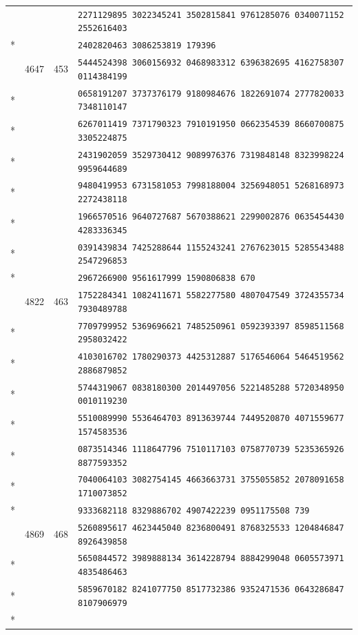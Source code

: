 \documentclass[10pt]{article}
\begin{document}
\begin{longtable}{@{}r@{\quad}r@{\quad}r@{\quad}l@{}}
 & &  & \texttt{2271129895 3022345241 3502815841 9761285076 0340071152 2552616403}\\*
 & &  & \texttt{2402820463 3086253819 179396}\\
\addlinespace[2pt]
88 & 4647 & 453 & \texttt{5444524398 3060156932 0468983312 6396382695 4162758307 0114384199}\\*
 & &  & \texttt{0658191207 3737376179 9180984676 1822691074 2777820033 7348110147}\\*
 & &  & \texttt{6267011419 7371790323 7910191950 0662354539 8660700875 3305224875}\\*
 & &  & \texttt{2431902059 3529730412 9089976376 7319848148 8323998224 9959644689}\\*
 & &  & \texttt{9480419953 6731581053 7998188004 3256948051 5268168973 2272438118}\\*
 & &  & \texttt{1966570516 9640727687 5670388621 2299002876 0635454430 4283336345}\\*
 & &  & \texttt{0391439834 7425288644 1155243241 2767623015 5285543488 2547296853}\\*
 & &  & \texttt{2967266900 9561617999 1590806838 670}\\
\addlinespace[2pt]
89 & 4822 & 463 & \texttt{1752284341 1082411671 5582277580 4807047549 3724355734 7930489788}\\*
 & &  & \texttt{7709799952 5369696621 7485250961 0592393397 8598511568 2958032422}\\*
 & &  & \texttt{4103016702 1780290373 4425312887 5176546064 5464519562 2886879852}\\*
 & &  & \texttt{5744319067 0838180300 2014497056 5221485288 5720348950 0010119230}\\*
 & &  & \texttt{5510089990 5536464703 8913639744 7449520870 4071559677 1574583536}\\*
 & &  & \texttt{0873514346 1118647796 7510117103 0758770739 5235365926 8877593352}\\*
 & &  & \texttt{7040064103 3082754145 4663663731 3755055852 2078091658 1710073852}\\*
 & &  & \texttt{9333682118 8329886702 4907422239 0951175508 739}\\
\addlinespace[2pt]
90 & 4869 & 468 & \texttt{5260895617 4623445040 8236800491 8768325533 1204846847 8926439858}\\*
 & &  & \texttt{5650844572 3989888134 3614228794 8884299048 0605573971 4835486463}\\*
 & &  & \texttt{5859670182 8241077750 8517732386 9352471536 0643286847 8107906979}\\*

\end{longtable}
\end{document}

